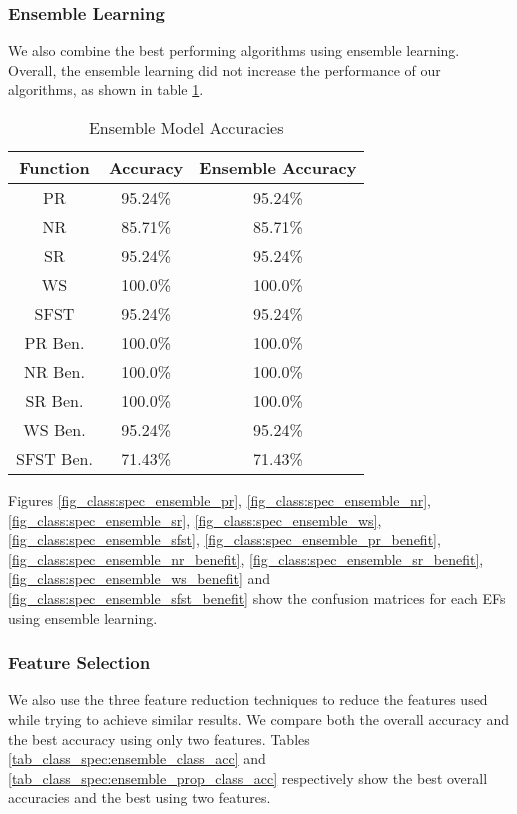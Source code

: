 \documentclass[12pt,letterpaper]{article}
\begin{document}
\subsubsection{Ensemble Learning}
We also combine the best performing algorithms using ensemble learning.
Overall, the ensemble learning did not increase the performance of our algorithms, as shown in table \ref{tab_spec:class_ensemble}.
\begin{table}[H]
\centering
\begin{tabular}{|c|c|c|}
\hline
\textbf{Function} & \textbf{Accuracy} & \textbf{Ensemble Accuracy} \\
\hline
PR      & 95.24\% & 95.24\% \\
\hline
NR      & 85.71\% & 85.71\%\\
\hline
SR      & 95.24\% & 95.24\%\\
\hline
WS      & 100.0\% & 100.0\%\\
\hline
SFST    & 95.24\% & 95.24\%\\
\hline
PR Ben. & 100.0\% & 100.0\%\\
\hline
NR Ben. & 100.0\% & 100.0\%\\
\hline
SR Ben. & 100.0\% & 100.0\%\\
\hline
WS Ben. & 95.24\% & 95.24\%\\
\hline
SFST Ben. & 71.43\% & 71.43\%\\
\hline
\end{tabular}
\caption{Ensemble Model Accuracies}
\label{tab_spec:class_ensemble}
\end{table}

Figures \ref{fig_class:spec_ensemble_pr}, \ref{fig_class:spec_ensemble_nr}, \ref{fig_class:spec_ensemble_sr}, \ref{fig_class:spec_ensemble_ws}, \ref{fig_class:spec_ensemble_sfst}, \ref{fig_class:spec_ensemble_pr_benefit}, \ref{fig_class:spec_ensemble_nr_benefit}, \ref{fig_class:spec_ensemble_sr_benefit}, \ref{fig_class:spec_ensemble_ws_benefit} and \ref{fig_class:spec_ensemble_sfst_benefit} show the confusion matrices for each EFs using ensemble learning.

\subsubsection{Feature Selection}
We also use the three feature reduction techniques to reduce the features used while trying to achieve similar results.
We compare both the overall accuracy and the best accuracy using only two features.
Tables \ref{tab_class_spec:ensemble_class_acc} and \ref{tab_class_spec:ensemble_prop_class_acc} respectively show the best overall accuracies and the best using two features.
\end{document}

